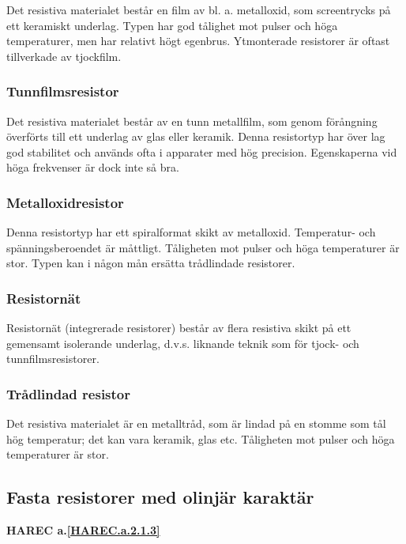 Det resistiva materialet består en film av bl. a. metalloxid, som screentrycks
på ett keramiskt underlag. Typen har god tålighet mot pulser och höga
temperaturer, men har relativt högt egenbrus. Ytmonterade resistorer är oftast
tillverkade av tjockfilm.

\subsubsection{Tunnfilmsresistor}

Det resistiva materialet består av en tunn metallfilm, som genom förångning
överförts till ett underlag av glas eller keramik. Denna resistortyp har över
lag god stabilitet och används ofta i apparater med hög precision. Egenskaperna
vid höga frekvenser är dock inte så bra.

\subsubsection{Metalloxidresistor}

Denna resistortyp har ett spiralformat skikt av metalloxid. Temperatur- och
spänningsberoendet är måttligt. Tåligheten mot pulser och höga temperaturer är
stor. Typen kan i någon mån ersätta trådlindade resistorer.

\subsubsection{Resistornät}

Resistornät (integrerade resistorer) består av flera resistiva skikt på ett
gemensamt isolerande underlag, d.v.s. liknande teknik som för tjock- och
tunnfilmsresistorer.

\subsubsection{Trådlindad resistor}

Det resistiva materialet är en metalltråd, som är lindad på en stomme som tål
hög temperatur; det kan vara keramik, glas etc.
Tåligheten mot pulser och höga temperaturer är stor.

\subsection{Fasta resistorer med olinjär karaktär}
\textbf{HAREC a.\ref{HAREC.a.2.1.3}\label{myHAREC.a.2.1.3}}

